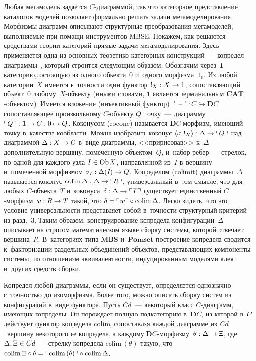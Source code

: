 \begin{multicols}{2}
   Любая мегамодель задается $C$-диа\-грам\-мой, так что категорное 
представление каталогов моделей позволяет формально решать задачи 
мегамоделирования. Морфизмы диаграмм описывают структурные 
преобразования мегамоделей, выполняемые при помощи инструментов MBSE. 
Покажем, как решаются средствами теории категорий прямые задачи 
мегамоделирования. Здесь применяется одна из основных  
тео\-ре\-ти\-ко-ка\-те\-гор\-ных конструкций~--- копредел  
диаграммы~\cite{5-kov}, который строится следующим образом. Обозначим 
через~$\mathbf{1}$ категорию,\linebreak состоящую из одного объекта~0 и~одного 
морфизма~$1_0$. Из любой категории~$X$ имеется в~точ\-ности один 
функтор~$!_X : X \hm\to \mathbf{1}$, сопоставляющий объект~0  
любому~$X$-объ\-ек\-ту (иными словами, $\mathbf{1}$ является терминальным 
$\mathbf{CAT}$-объ\-ек\-том). Имеется вложение (инъективный функтор) 
$\ulcorner \mbox{--}\urcorner : C \hookrightarrow \mathbf{D}C$, сопоставляющее 
произвольному $C$-объ\-ек\-ту $Q$~точку~--- диаграмму $\ulcorner Q\urcorner : 
\mathbf{1}\hm\to  C : 0 \mapsto Q$. Коконусом (cocone) называется 
$\mathbf{D}C$-мор\-физм, имеющий точку в~качестве кообласти. Можно 
изобразить коконус $\langle \sigma, !_X\rangle : \Delta\hm\to \ulcorner 
Q\urcorner$ над диаграммой $\Delta : X\hm\to C$ в~виде диаграммы, 
<<пририсовав>> к~$\Delta$ дополнительную вершину, помеченную 
объектом~$Q$, и~набор ребер~--- стрелок, по одной для каждого узла $I\hm\in 
\mathrm{Ob}\,X$, направленной из~$I$ в~вершину и~помеченной морфизмом 
$\sigma_I : \Delta (I) \hm\to Q$. Копределом (colimit) диаграммы~$\Delta$ 
называется коконус $\mathrm{colim}\,\Delta : \Delta\hm\to \ulcorner R\urcorner$, 
универсальный в~том смысле, что для любых \mbox{$C$-объ}\-ек\-та~$T$ 
и~коконуса~$\delta : \Delta\hm\to\ulcorner T\urcorner$ существует единственный 
$C$-мор\-физм~$w : R \hm\to T$ такой, что $\delta\hm= \ulcorner w\urcorner \circ  
\mathrm{colim}\,\Delta$. Легко видеть, что это условие универсальности 
представляет собой в~точности структурный критерий из разд.~3. Таким 
образом, конструирование копредела конфигурации~$\Delta$ описывает на 
строгом математическом языке сборку системы, которой отвечает 
вершина~$R$. В~категориях типа $\mathbf{MBS}$ и~$\mathbf{Pomset}$ 
построение копредела сводится к~факторизации раздельных объединений 
объектов, представляющих компоненты системы, по отношениям 
эквивалентности, индуцированным моделями клея и~других средств сборки.
   
   Копредел любой диаграммы, если он сущест\-вует, определяется однозначно 
   с~точностью до изомор\-физма. Более того, можно описать сборку сис\-тем из 
конфигураций в~виде функтора. Пусть $Cd$~--- некоторый класс  
$C$-диа\-грамм, имеющих копределы. Он порождает полную подкатегорию 
в~$\mathbf{D}C$, из которой в~$C$ действует функтор копредела $\mathrm{colim}$, 
сопоставляя каждой диаграмме из~$Cd$~вершину некоторого ее копредела, а 
каждому \mbox{$\mathbf{D}C$-мор}\-физ\-му~$\theta : \Delta\hm\to \Xi$, 
где~$\Delta, \Xi\hm\in Cd$~--- стрелку копредела $\mathrm{colim}\,(\theta)$ такую, что 
$\mathrm{colim}\,\Xi \circ \theta \hm= \ulcorner \mathrm{colim}\,(\theta)\urcorner \circ 
\mathrm{colim}\,\Delta$.


\end{multicols}
